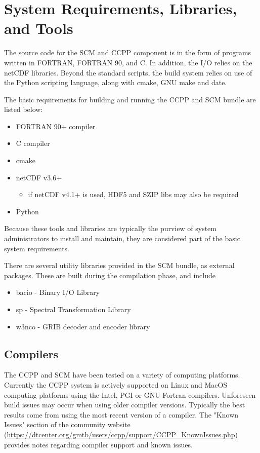 \section{System Requirements, Libraries, and Tools}
\label{section: systemrequirements}

The source code for the SCM and CCPP component is in the form
of programs written in FORTRAN, FORTRAN 90, and C. In addition, the I/O relies on the netCDF
libraries. Beyond the standard scripts, the build system relies
on use of the Python scripting language, along with cmake, GNU make and date.

The basic requirements for building and running the CCPP and SCM bundle are
listed below:

\begin{itemize}
	\item FORTRAN 90+ compiler
	\item C compiler
	\item cmake 
	\item netCDF v3.6+
        \begin{itemize}
	\item if netCDF v4.1+ is used, HDF5 and SZIP libs may also be required
\end{itemize}
	\item Python
\end{itemize}


Because these tools and libraries are typically the purview of
system administrators to install and maintain, they are considered 
part of the basic system requirements.


There are several utility libraries provided in the SCM bundle, as external packages.  These
are built during the compilation phase, and include


\begin{itemize}
	\item bacio - Binary I/O Library
	\item sp - Spectral Transformation Library
	\item w3nco - GRIB decoder and encoder library
\end{itemize}



\subsection{Compilers}
The CCPP and SCM have been tested on a variety of
computing platforms. Currently the CCPP system is actively supported
on Linux and MacOS computing platforms using the Intel, PGI or GNU Fortran
compilers. Unforeseen build issues may occur when using older
compiler versions. Typically the best results come from using the
most recent version of a compiler. The "Known Issues" section of the
community website (\url{https://dtcenter.org/gmtb/users/ccpp/support/CCPP_KnownIssues.php}) provides notes regarding compiler support and known issues.



